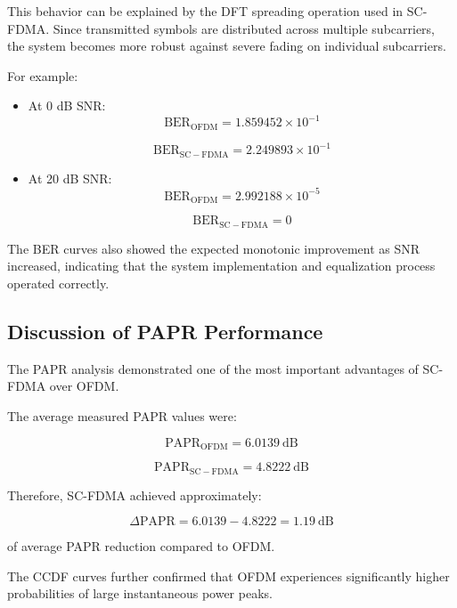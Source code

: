 This behavior can be explained by the DFT spreading operation used in
SC-FDMA. Since transmitted symbols are distributed across multiple
subcarriers, the system becomes more robust against severe fading on
individual subcarriers.

For example:

\begin{itemize}
    \item At 0 dB SNR:
    \[
    \mathrm{BER}_{\mathrm{OFDM}} = 1.859452 \times 10^{-1}
    \]
    
    \[
    \mathrm{BER}_{\mathrm{SC-FDMA}} = 2.249893 \times 10^{-1}
    \]

    \item At 20 dB SNR:
    \[
    \mathrm{BER}_{\mathrm{OFDM}} = 2.992188 \times 10^{-5}
    \]

    \[
    \mathrm{BER}_{\mathrm{SC-FDMA}} = 0
    \]
\end{itemize}

The BER curves also showed the expected monotonic improvement as SNR
increased, indicating that the system implementation and equalization
process operated correctly.

\subsection{Discussion of PAPR Performance}

The PAPR analysis demonstrated one of the most important advantages of
SC-FDMA over OFDM.

The average measured PAPR values were:

\begin{equation}
\mathrm{PAPR}_{\mathrm{OFDM}} = 6.0139 \ \mathrm{dB}
\end{equation}

\begin{equation}
\mathrm{PAPR}_{\mathrm{SC-FDMA}} = 4.8222 \ \mathrm{dB}
\end{equation}

Therefore, SC-FDMA achieved approximately:

\begin{equation}
\Delta \mathrm{PAPR}
=
6.0139 - 4.8222
=
1.19 \ \mathrm{dB}
\end{equation}

of average PAPR reduction compared to OFDM.

The CCDF curves further confirmed that OFDM experiences significantly
higher probabilities of large instantaneous power peaks.

